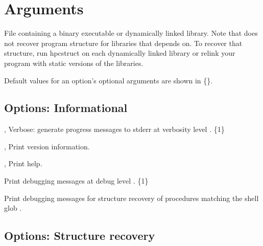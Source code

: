 \documentclass[english]{article}
\begin{document}
\section{Arguments}


\begin{Description}
\item[\Arg{binary}] File containing a binary executable or dynamically linked library.
Note that  does not recover program structure for libraries that  depends on.
To recover that structure, run hpcstruct on each dynamically linked library
or relink your program with static versions of the libraries.
\end{Description}

Default values for an option's optional arguments are shown in \{\}.

\subsection{Options: Informational}

\begin{Description}
\item[\OptoArg{-v}{n}, \OptoArg{--verbose}{n}]
Verbose: generate progress messages to stderr at verbosity level .  \{1\}

\item[\Opt{-V}, \Opt{--version}]
Print version information.

\item[\Opt{-h}, \Opt{--help}]
Print help.

\item[\OptoArg{--debug}{n}]
Print debugging messages at debug level . \{1\}

\item[\OptArg{--debug-proc}{glob}]
Print debugging messages for structure recovery of procedures matching the shell glob .
\end{Description}


\subsection{Options: Structure recovery}
\end{document}
